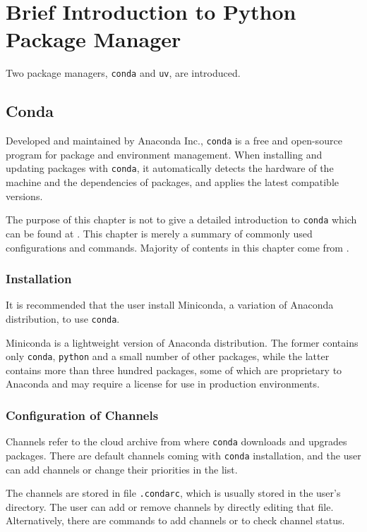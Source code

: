 \chapter{Brief Introduction to Python Package Manager}

Two package managers, \verb|conda| and \verb|uv|, are introduced.

\section{Conda}

Developed and maintained by Anaconda Inc., \verb|conda| is a free and open-source program for package and environment management. When installing and updating packages with \verb|conda|, it automatically detects the hardware of the machine and the dependencies of packages, and applies the latest compatible versions.

The purpose of this chapter is not to give a detailed introduction to \verb|conda| which can be found at \cite{conda2025}. This chapter is merely a summary of commonly used configurations and commands. Majority of contents in this chapter come from \cite{conda2025cheatsheet}.

\subsection{Installation}

It is recommended that the user install Miniconda, a variation of Anaconda distribution, to use \verb|conda|.

Miniconda is a lightweight version of Anaconda distribution. The former contains only \verb|conda|, \verb|python| and a small number of other packages, while the latter contains more than three hundred packages, some of which are proprietary to Anaconda and may require a license for use in production environments.

\subsection{Configuration of Channels}

Channels refer to the cloud archive from where \verb|conda| downloads and upgrades packages. There are default channels coming with \verb|conda| installation, and the user can add channels or change their priorities in the list.

The channels are stored in file \verb|.condarc|, which is usually stored in the user's directory. The user can add or remove channels by directly editing that file. Alternatively, there are commands to add channels or to check channel status. 

